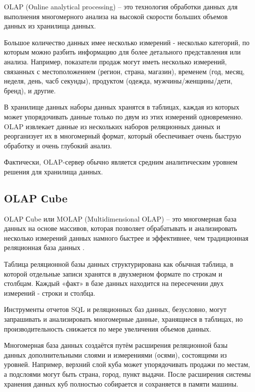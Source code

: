 OLAP (Online analytical processing) \cite{olap} -- это технология обработки данных для выполнения 
многомерного анализа на высокой скорости больших объемов данных из хранилища данных.

Большое количество данных имее несколько измерений - несколько категорий, по которым можно разбить информацию для более детального представления или анализа. 
Например, показатели продаж могут иметь несколько измерений, связанных с местоположением (регион, страна,  магазин), временем (год, месяц, неделя, день, часб секунды), продуктом (одежда,  мужчины/женщины/дети, бренд), и другие.

В хранилище данных наборы данных хранятся в таблицах, каждая из которых может упорядочивать данные только по двум из этих измерений одновременно. OLAP извлекает данные из нескольких наборов реляционных данных и реорганизует их в многомерный формат, который обеспечивает очень быструю обработку и очень глубокий анализ.

Фактически, OLAP-сервер обычно является средним аналитическим уровнем решения для хранилища данных.


\subsection*{OLAP Сube}

 OLAP Сube или MOLAP (Multidimensional OLAP) \cite{olap-cube} -- это многомерная база данных на основе массивов, которая позволяет обрабатывать и анализировать несколько измерений данных намного быстрее и эффективнее, чем традиционная реляционная база данных .
 
 Таблица реляционной базы данных структурирована как обычная таблица, в которой отдельные записи хранятся в двухмерном формате по строкам и столбцам. Каждый «факт» в базе данных находится на пересечении двух измерений - строки и столбца.
 
 Инструменты отчетов SQL и реляционных баз данных, безусловно, могут запрашивать и анализировать многомерные данные, хранящиеся в таблицах, но производительность снижается по мере увеличения объемов данных.
 
 Многомерная база данных создаётся путём расширения реляционной базы данных дополнительными слоями и измерениями (осями), состоящими из уровней.
 Например, верхний слой куба может упорядочивать продажи по местам, а подслоями могут быть страна, город, пункт выдачи. 
 После расширения системы хранения данных куб полностью собирается и сохраняется в памяти машины.
 
